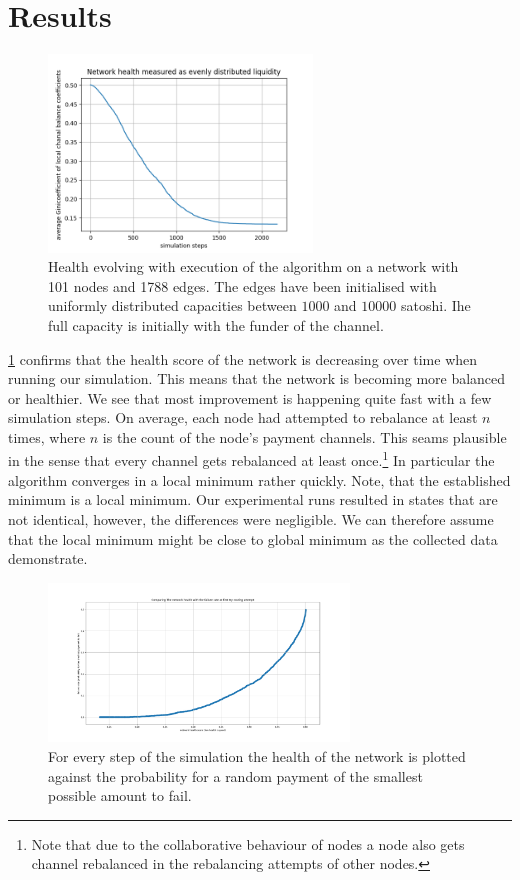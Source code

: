 \documentclass[a4paper]{paper}
\begin{document}
\section{Results}\label{sec:results}

\begin{figure}
 \centering
 \includegraphics[width=7cm]{code/results/routabilityTest/1574847007_figure.png}
 \caption{Health evolving with execution of the algorithm on a network with 101 nodes and 1788 edges. The edges have been initialised with uniformly distributed capacities between $1000$ and $10000$ satoshi. Ihe full capacity is initially with the funder of the channel.}
 \label{fig:healthovertime}
\end{figure}

\cref{fig:healthovertime} confirms that the health score of the network is decreasing over time when running our simulation.
This means that the network is becoming more balanced or healthier.
We see that most improvement is happening quite fast with a few simulation steps.
On average, each node had attempted to rebalance at least $n$ times, where $n$ is the count of the node's payment channels.
This seams plausible in the sense that every channel gets rebalanced at least once.\footnote{Note that due to the collaborative behaviour of nodes a node also gets channel rebalanced in the rebalancing attempts of other nodes.} 
In particular the algorithm converges in a local minimum rather quickly.
Note, that the established minimum is a local minimum. 
Our experimental runs resulted in states that are not identical, however, the differences were negligible. 
We can therefore assume that the local minimum might be close to global minimum as the collected data demonstrate.

\begin{figure}
 \centering
 \includegraphics[width=8cm]{code/results/routabilityTest/health vs payment rate.png}
 \caption{For every step of the simulation the health of the network is plotted against the probability for a random payment of the smallest possible amount to fail.}
 \label{fig:healthVsFailurerate}
\end{figure}
\end{document}
